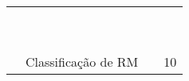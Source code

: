 \begin{table}[htbp]
{\begin{tabular}{|c|l|l|c|}
                              &                                                  & \cite{Naguib2013}                              &                      \\
                              &                                                  & \cite{Nagwani2012}                             &                      \\
                              &                                                  & \cite{shokripour2012automatic}                 &                      \\
                              &                                                  & \cite{tian2015automated}                       &                      \\
                              &                                                  & \cite{ValdiviaGarcia:2014:CPB:2597073.2597099} &                      \\
                              &                                                  & \cite{Wu2011}                                  &                      \\
                              &                                                  & \cite{Xuan:2012:DPB:2337223.2337227}           &                      \\
                              &                                                  & \cite{Zanetti2013}                             &                      \\
                              &                                                  & \cite{Zhang2014}                               &                      \\ \cline{2-4} 
                              & \multirow{10}{*}{Classificação de RM}            & \cite{behl2014bug}                             & \multirow{10}{*}{10} \\
                              &                                                  & \cite{chawla2015automated}                     &                      \\
                              &                                                  & \cite{Gegick2010}                              &                      \\
                              &                                                  & \cite{Izquierdo2015}                           &                      \\
                              &                                                  & \cite{kochhar2014automatic}                    &                      \\

\end{tabular}}
\end{table}
